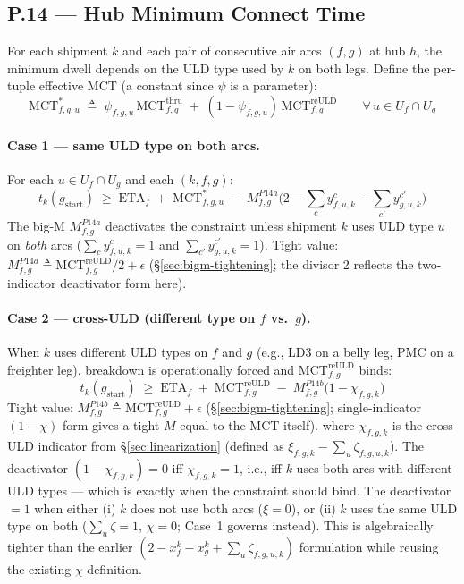 \documentclass[11pt,a4paper]{article}
\newcommand{\defeq}{\triangleq}
\theoremstyle{definition}
\begin{document}
\subsection*{P.14 — Hub Minimum Connect Time}

For each shipment $k$ and each pair of consecutive air arcs $(f, g)$ at hub $h$, the
minimum dwell depends on the ULD type used by $k$ on both legs. Define the per-tuple
effective MCT (a constant since $\psi$ is a parameter):
\begin{equation}
  \text{MCT}^*_{f,g,u}
  \;\defeq\; \psi_{f,g,u}\,\text{MCT}^{\text{thru}}_{f,g}
            \;+\; (1 - \psi_{f,g,u})\,\text{MCT}^{\text{reULD}}_{f,g}
  \qquad \forall\, u \in U_f \cap U_g
  \label{eq:effective-mct}
\end{equation}

\paragraph{Case 1 --- same ULD type on both arcs.}
For each $u \in U_f \cap U_g$ and each $(k, f, g)$:
\begin{equation}
  t_k(g_{\text{start}}) \;\geq\; \text{ETA}_f \;+\; \text{MCT}^*_{f,g,u}
  \;-\; M^{P14a}_{f,g}\!\biggl( 2 - \sum_{c} y^{c}_{f,u,k} - \sum_{c'} y^{c'}_{g,u,k} \biggr)
  \label{eq:P14a}
\end{equation}
The big-M $M^{P14a}_{f,g}$ deactivates the constraint unless shipment $k$ uses ULD type $u$ on
\emph{both} arcs ($\sum_c y^c_{f,u,k} = 1$ and $\sum_{c'} y^{c'}_{g,u,k} = 1$). Tight
value: $M^{P14a}_{f,g} \defeq \text{MCT}^{\text{reULD}}_{f,g} / 2 + \epsilon$
(\S\ref{sec:bigm-tightening}; the divisor 2 reflects the two-indicator deactivator
form here).

\paragraph{Case 2 --- cross-ULD (different type on $f$ vs.\ $g$).}
When $k$ uses different ULD types on $f$ and $g$ (e.g., LD3 on a belly leg, PMC on a
freighter leg), breakdown is operationally forced and $\text{MCT}^{\text{reULD}}_{f,g}$
binds:
\begin{equation}
  t_k(g_{\text{start}}) \;\geq\; \text{ETA}_f \;+\; \text{MCT}^{\text{reULD}}_{f,g}
  \;-\; M^{P14b}_{f,g}\bigl( 1 - \chi_{f,g,k} \bigr)
  \label{eq:P14b}
\end{equation}
Tight value: $M^{P14b}_{f,g} \defeq \text{MCT}^{\text{reULD}}_{f,g} + \epsilon$
(\S\ref{sec:bigm-tightening}; single-indicator $(1-\chi)$ form gives a tight $M$
equal to the MCT itself).
where $\chi_{f,g,k}$ is the cross-ULD indicator from \S\ref{sec:linearization}
(defined as $\xi_{f,g,k} - \sum_u \zeta_{f,g,u,k}$). The deactivator
$(1 - \chi_{f,g,k}) = 0$ iff $\chi_{f,g,k} = 1$, i.e., iff $k$ uses both arcs with
different ULD types --- which is exactly when the constraint should bind. The
deactivator $= 1$ when either (i) $k$ does not use both arcs ($\xi = 0$), or (ii) $k$
uses the same ULD type on both ($\sum_u \zeta = 1$, $\chi = 0$; Case~1 governs
instead). This is algebraically tighter than the earlier $(2 - x_f^k - x_g^k + \sum_u
\zeta_{f,g,u,k})$ formulation while reusing the existing $\chi$ definition.
\end{document}
